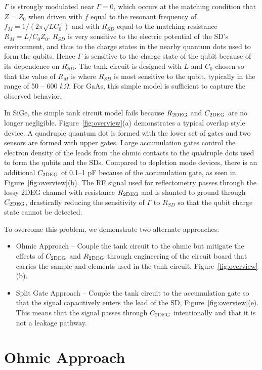 \documentclass{article}
\begin{document}
	$\Gamma$ is strongly modulated near $\Gamma = 0$, which occurs at the matching condition that $Z=Z_0$ when driven with $f$ equal to the resonant frequency of $f_M=1/(2\pi \sqrt{LC_0})$ and with $R_{SD}$ equal to the matching resistance $R_M=L/C_0Z_0$. $R_{SD}$ is very sensitive to the electric potential of the SD's environment, and thus to the charge states in the nearby quantum dots used to form the qubits.  Hence $\Gamma$ is sensitive to the charge state of the qubit because of its dependence on $R_{SD}$.  The tank circuit is designed with $L$ and $C_0$ chosen so that the value of $R_M$ is where $R_{SD}$ is most sensitive to the qubit, typically in the range  of 50 -- 600 $k\Omega$.  For GaAs, this simple model is sufficient to capture the observed behavior. 


	In SiGe, the simple tank circuit model fails because $R_{\rm 2DEG}$ and $C_{\rm 2DEG}$ are no longer negligible.	Figure\ \ref{fig:overview}(a) demonstrates a typical overlap style device.  A quadruple quantum dot is formed with the lower set of gates and two sensors are formed with upper gates. Large accumulation gates control the electron density of the leads from the ohmic contacts to the quadruple dots used to form the qubits and the SDs.  Compared to depletion mode devices, there is an additional $C_{\rm 2DEG}$ of 0.1--1 pF because of the accumulation gate, as seen in Figure\ \ref{fig:overview}(b).  The RF signal used for reflectometry passes through the lossy 2DEG channel with resistance $R_{\rm 2DEG}$ and is shunted to ground through $C_{\rm 2DEG}$, drastically reducing the sensitivity of $\Gamma$ to $R_{SD}$ so that the qubit charge state cannot be detected. 


	To overcome this problem, we demonstrate two alternate approaches:
	\begin{itemize}
		\item Ohmic Approach -- Couple the tank circuit to the ohmic but mitigate the effects of $C_{\rm 2DEG}$ and $R_{\rm 2DEG}$ through engineering of the circuit board that carries the sample and elements used in the tank circuit, Figure\ \ref{fig:overview}(b).
		\item Split Gate Approach -- Couple the tank circuit to the accumulation gate so that the signal capacitively enters the lead of the SD, Figure\ \ref{fig:overview}(e).  This means that the signal passes through $C_{\rm 2DEG}$ intentionally and that it is not a leakage pathway.
	\end{itemize}

\section{Ohmic Approach} %
\end{document}
